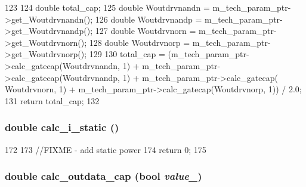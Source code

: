 \begin{DoxyCode}
123 {
124     double total_cap;
125     double Woutdrvnandn = m_tech_param_ptr->get_Woutdrvnandn();
126     double Woutdrvnandp = m_tech_param_ptr->get_Woutdrvnandp();
127     double Woutdrvnorn = m_tech_param_ptr->get_Woutdrvnorn();
128     double Woutdrvnorp = m_tech_param_ptr->get_Woutdrvnorp();
129 
130     total_cap = (m_tech_param_ptr->calc_gatecap(Woutdrvnandn, 1) + 
      m_tech_param_ptr->calc_gatecap(Woutdrvnandp, 1) + m_tech_param_ptr->calc_gatecap(
      Woutdrvnorn, 1) + m_tech_param_ptr->calc_gatecap(Woutdrvnorp, 1)) / 2.0;
131     return total_cap;
132 }
\end{DoxyCode}
\hypertarget{classOutdrvUnit_a0027807356ac4ca07fe2e593234eb884}{
\subsubsection[{calc\_\-i\_\-static}]{\setlength{\rightskip}{0pt plus 5cm}double calc\_\-i\_\-static ()}}
\label{classOutdrvUnit_a0027807356ac4ca07fe2e593234eb884}



\begin{DoxyCode}
172 {
173     //FIXME - add static power
174     return 0;
175 }
\end{DoxyCode}
\hypertarget{classOutdrvUnit_a354dc4ee2b45109142f891c166d1cb7b}{
\subsubsection[{calc\_\-outdata\_\-cap}]{\setlength{\rightskip}{0pt plus 5cm}double calc\_\-outdata\_\-cap (bool {\em value\_\-})}}
\label{classOutdrvUnit_a354dc4ee2b45109142f891c166d1cb7b}



